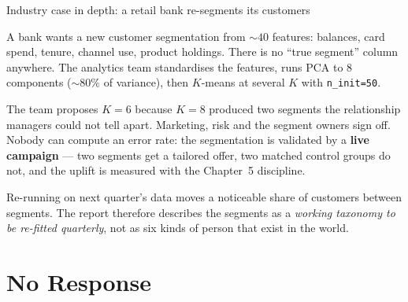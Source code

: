 \documentclass[aspectratio=169,11pt]{beamer}
\begin{document}
\begin{frame}{Industry case in depth: a retail bank re-segments its customers}
  \footnotesize
  \begin{industry}
    A bank wants a new customer segmentation from $\sim$$40$ features: balances, card
    spend, tenure, channel use, product holdings. There is no ``true segment'' column
    anywhere. The analytics team standardises the features, runs PCA to $8$ components
    ($\sim$$80\%$ of variance), then $K$-means at several $K$ with \texttt{n\_init=50}.
  \end{industry}
  \begin{readme}
    The team proposes $K=6$ because $K=8$ produced two segments the relationship managers
    could not tell apart. Marketing, risk and the segment owners sign off. Nobody can
    compute an error rate: the segmentation is validated by a \textbf{live campaign} --- two
    segments get a tailored offer, two matched control groups do not, and the uplift is
    measured with the Chapter~5 discipline.
  \end{readme}
  \begin{takeaway}
    Re-running on next quarter's data moves a noticeable share of customers between
    segments. The report therefore describes the segments as a \emph{working taxonomy to be
    re-fitted quarterly}, not as six kinds of person that exist in the world.
  \end{takeaway}
\end{frame}

\section{No Response}
\end{document}
